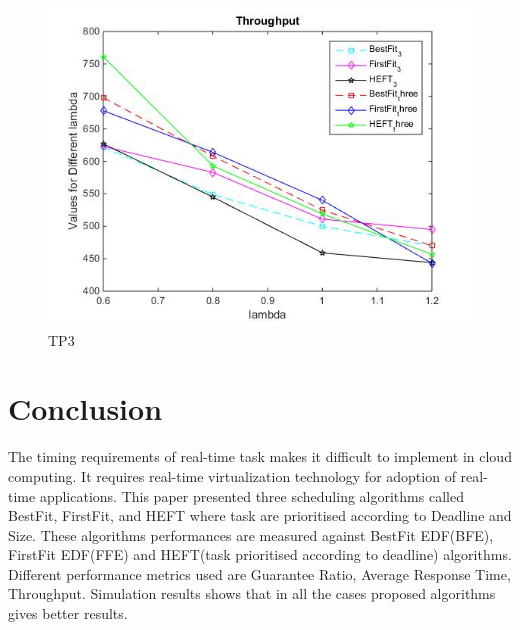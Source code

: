 \documentclass[conference]{IEEEtran}
\begin{document}

\begin{figure}[htbp]
\includegraphics[scale=0.45]{tp_3_p.jpg}
\caption{TP3}
\label{fig}
\end{figure}



\section{Conclusion}
The timing requirements of real-time task makes it difficult
to implement in cloud computing. It requires real-time virtualization technology for adoption of real-time applications. This paper presented three scheduling algorithms called BestFit, FirstFit, and HEFT where task are prioritised according to Deadline and Size. These algorithms performances are measured against BestFit EDF(BFE), FirstFit EDF(FFE) and HEFT(task prioritised according to deadline) algorithms. Different performance metrics used are Guarantee Ratio, Average Response Time, Throughput. Simulation results shows
that in all the cases proposed algorithms gives better results.
\end{document}
